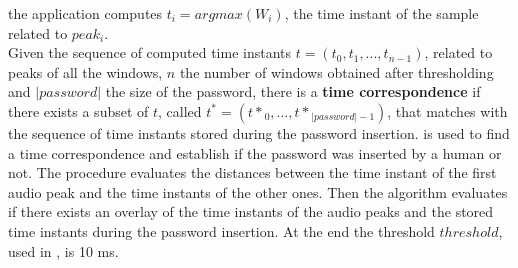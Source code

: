 the application computes $t_i= argmax(W_i)$, the time instant of the sample related to $peak_i$.\\
Given the sequence of computed time instants $t=(t_0, t_1, ..., t_{n-1})$, related to peaks of all the windows, $n$ the number of windows obtained after thresholding and $|password|$ the size of the password, there is a \textbf{time correspondence} if there exists a subset of $t$, called $t^{*}=({t*}_0, ..., {t*}_{|password|-1})$, that matches with the sequence of time instants stored during the password insertion.  is used to find a time correspondence and establish if the password was inserted by a human or not. The procedure evaluates the distances between the time instant of the first audio peak and the time instants of the other ones. Then the algorithm evaluates if there exists an overlay of the time instants of the audio peaks and the stored time instants during the password insertion. At the end the threshold $threshold$, used in , is 10 ms.
